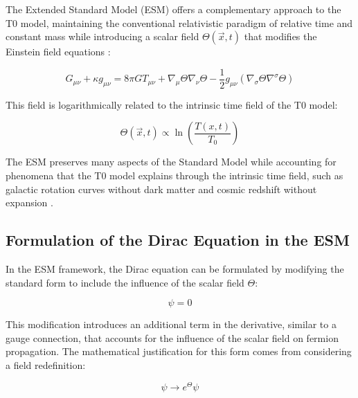 \documentclass[12pt,a4paper]{article}
\newcommand{\Tfieldt}{T(x,t)}
\newcommand{\Tzero}{T_0}
\newcommand{\vecx}{\vec{x}}
\begin{document}
	The Extended Standard Model (ESM) offers a complementary approach to the T0 model, maintaining the conventional relativistic paradigm of relative time and constant mass while introducing a scalar field $\Theta(\vecx,t)$ that modifies the Einstein field equations \cite{pascher_esm_comparison_2025}:
	
	\begin{equation}
		G_{\mu\nu} + \kappa g_{\mu\nu} = 8\pi G T_{\mu\nu} + \nabla_{\mu}\Theta\nabla_{\nu}\Theta - \frac{1}{2}g_{\mu\nu}(\nabla_{\sigma}\Theta\nabla^{\sigma}\Theta)
		\label{eq:modified_einstein}
	\end{equation}
	
	This field is logarithmically related to the intrinsic time field of the T0 model:
	
	\begin{equation}
		\Theta(\vecx,t) \propto \ln\left(\frac{\Tfieldt}{\Tzero}\right)
		\label{eq:theta_relation}
	\end{equation}
	
	The ESM preserves many aspects of the Standard Model while accounting for phenomena that the T0 model explains through the intrinsic time field, such as galactic rotation curves without dark matter and cosmic redshift without expansion \cite{pascher_standardmod_2025}.
	
	\subsection{Formulation of the Dirac Equation in the ESM}
	\label{subsec:dirac_formulation}
	
	In the ESM framework, the Dirac equation can be formulated by modifying the standard form to include the influence of the scalar field $\Theta$:
	
	\begin{equation}
		[i\gamma^{\mu}(\partial_{\mu} + \partial_{\mu}\Theta) - m]\psi = 0
		\label{eq:modified_dirac}
	\end{equation}
	
	This modification introduces an additional term in the derivative, similar to a gauge connection, that accounts for the influence of the scalar field on fermion propagation. The mathematical justification for this form comes from considering a field redefinition:
	
	\begin{equation}
		\psi \rightarrow e^{\Theta}\psi
		\label{eq:field_redefinition}
	\end{equation}
	
\end{document}
